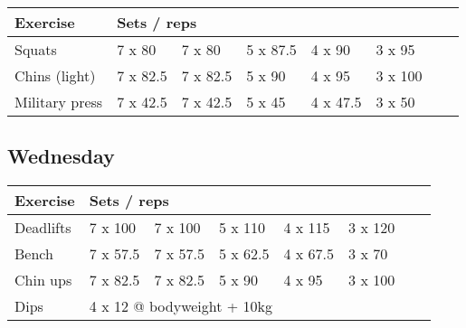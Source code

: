 \documentclass[12pt, a4paper]{article}%
\begin{document}
  \begin{tabular}{l|lllllll}
  \hspace{0.75em} \textbf{Exercise} & \multicolumn{ 7 }{l}{ \textbf{Sets / reps} } \\ \hline

            \hspace{0.75em} Squats
            & 7 x 80
            & 7 x 80
            & 5 x 87.5
            & 4 x 90
            & 3 x 95
            & 
            & 
            \\


            \hspace{0.75em} Chins (light)
            & 7 x 82.5
            & 7 x 82.5
            & 5 x 90
            & 4 x 95
            & 3 x 100
            & 
            & 
            \\


            \hspace{0.75em} Military press
            & 7 x 42.5
            & 7 x 42.5
            & 5 x 45
            & 4 x 47.5
            & 3 x 50
            & 
            & 
            \\


  \end{tabular}

  \subsection*{\hspace{0.5em} Wednesday }


  \begin{tabular}{l|lllllll}
  \hspace{0.75em} \textbf{Exercise} & \multicolumn{ 7 }{l}{ \textbf{Sets / reps} } \\ \hline

            \hspace{0.75em} Deadlifts
            & 7 x 100
            & 7 x 100
            & 5 x 110
            & 4 x 115
            & 3 x 120
            & 
            & 
            \\


            \hspace{0.75em} Bench
            & 7 x 57.5
            & 7 x 57.5
            & 5 x 62.5
            & 4 x 67.5
            & 3 x 70
            & 
            & 
            \\


            \hspace{0.75em} Chin ups
            & 7 x 82.5
            & 7 x 82.5
            & 5 x 90
            & 4 x 95
            & 3 x 100
            & 
            & 
            \\


   \hspace{0.75em} Dips &  \multicolumn{ 7 }{l}{ 4 x 12 @ bodyweight + 10kg } \\
  \end{tabular}
\end{document}
